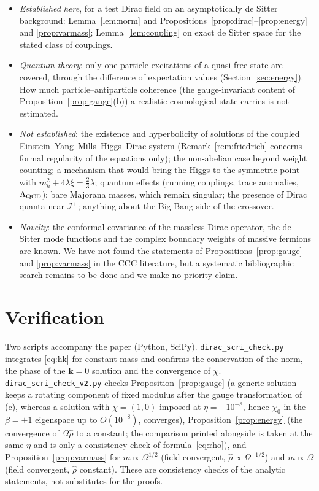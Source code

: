 \documentclass[11pt,a4paper]{article}
\theoremstyle{definition}
\newcommand{\scri}{\mathscr{I}^{+}}
\begin{document}
\begin{itemize}[leftmargin=1.5em]
\item \emph{Established here}, for a test Dirac field on an asymptotically de Sitter background: Lemma~\ref{lem:norm} and Propositions~\ref{prop:dirac}--\ref{prop:energy} and \ref{prop:varmass}; Lemma~\ref{lem:coupling} on exact de Sitter space for the stated class of couplings.
\item \emph{Quantum theory}: only one-particle excitations of a quasi-free state are covered, through the difference of expectation values (Section~\ref{sec:energy}). How much particle--antiparticle coherence (the gauge-invariant content of Proposition~\ref{prop:gauge}(b)) a realistic cosmological state carries is not estimated.
\item \emph{Not established}: the existence and hyperbolicity of solutions of the coupled Einstein--Yang--Mills--Higgs--Dirac system (Remark~\ref{rem:friedrich} concerns formal regularity of the equations only); the non-abelian case beyond weight counting; a mechanism that would bring the Higgs to the symmetric point with $m_{h}^{2}+4\lambda\xi=\tfrac23\lambda$; quantum effects (running couplings, trace anomalies, $\Lambda_{\rm QCD}$); bare Majorana masses, which remain singular; the presence of Dirac quanta near $\scri$; anything about the Big Bang side of the crossover.
\item \emph{Novelty}: the conformal covariance of the massless Dirac operator, the de Sitter mode functions and the complex boundary weights of massive fermions are known. We have not found the statements of Propositions~\ref{prop:gauge} and \ref{prop:varmass} in the CCC literature, but a systematic bibliographic search remains to be done and we make no priority claim.
\end{itemize}

\section*{Verification}
Two scripts accompany the paper (Python, SciPy). \texttt{dirac\_scri\_check.py} integrates \eqref{eq:hk} for constant mass and confirms the conservation of the norm, the phase of the $\mathbf{k}=0$ solution and the convergence of $\chi$. \texttt{dirac\_scri\_check\_v2.py} checks Proposition~\ref{prop:gauge} (a generic solution keeps a rotating component of fixed modulus after the gauge transformation of (c), whereas a solution with $\chi=(1,0)$ imposed at $\eta=-10^{-8}$, hence $\chi_{0}$ in the $\beta=+1$ eigenspace up to $O(10^{-8})$, converges), Proposition~\ref{prop:energy} (the convergence of $\Omega\hat\rho$ to a constant; the comparison printed alongside is taken at the same $\eta$ and is only a consistency check of formula~\eqref{eq:rho}), and Proposition~\ref{prop:varmass} for $m\propto\Omega^{1/2}$ (field convergent, $\hat\rho\propto\Omega^{-1/2}$) and $m\propto\Omega$ (field convergent, $\hat\rho$ constant). These are consistency checks of the analytic statements, not substitutes for the proofs.
\end{document}
